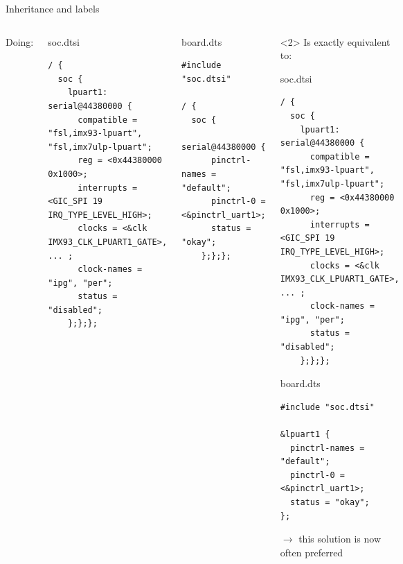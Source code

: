 \begin{frame}[fragile]{Inheritance and labels}

  \begin{columns}[t]
    Doing:
    \begin{block}{soc.dtsi}
      {\tiny
\begin{verbatim}
/ {
  soc {
    lpuart1: serial@44380000 {
      compatible = "fsl,imx93-lpuart", "fsl,imx7ulp-lpuart";
      reg = <0x44380000 0x1000>;
      interrupts = <GIC_SPI 19 IRQ_TYPE_LEVEL_HIGH>;
      clocks = <&clk IMX93_CLK_LPUART1_GATE>, ... ;
      clock-names = "ipg", "per";
      status = "disabled";
    };};};
\end{verbatim}
      }
    \end{block}

    \begin{block}{board.dts}
      {\tiny
\begin{verbatim}
#include "soc.dtsi"

/ {
  soc {
    serial@44380000 {
      pinctrl-names = "default";
      pinctrl-0 = <&pinctrl_uart1>;
      status = "okay";
    };};};

\end{verbatim}
      }
    \end{block}

    \begin{onlyenv}<2>
    Is exactly equivalent to:

    \begin{block}{soc.dtsi}
      {\tiny
\begin{verbatim}
/ {
  soc {
    lpuart1: serial@44380000 {
      compatible = "fsl,imx93-lpuart", "fsl,imx7ulp-lpuart";
      reg = <0x44380000 0x1000>;
      interrupts = <GIC_SPI 19 IRQ_TYPE_LEVEL_HIGH>;
      clocks = <&clk IMX93_CLK_LPUART1_GATE>, ... ;
      clock-names = "ipg", "per";
      status = "disabled";
    };};};
\end{verbatim}
      }
    \end{block}

    \begin{block}{board.dts}
      {\tiny
\begin{verbatim}
#include "soc.dtsi"

&lpuart1 {
  pinctrl-names = "default";
  pinctrl-0 = <&pinctrl_uart1>;
  status = "okay";
};
\end{verbatim}
        }
      \end{block}

      $\rightarrow$ this solution is now often preferred
      \end{onlyenv}
  \end{columns}

\end{frame}

